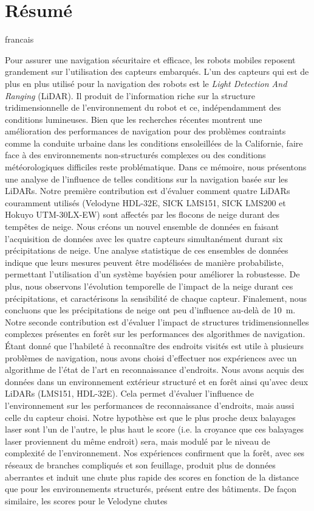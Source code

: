 \chapter*{Résumé}

\begin{otherlanguage*}{francais}

    Pour assurer une navigation sécuritaire et efficace, les robots mobiles reposent grandement sur l'utilisation des capteurs embarqués. L'un des capteurs qui est de plus en plus utilisé pour la navigation des robots est le \emph{Light Detection And Ranging} (LiDAR). Il produit de l'information riche sur la structure tridimensionnelle de l'environnement du robot et ce, indépendamment des conditions lumineuses. Bien que les recherches récentes montrent une amélioration des performances de navigation pour des problèmes contraints comme la conduite urbaine dans les conditions ensoleillées de la Californie, faire face à des environnements non-structurés complexes ou des conditions météorologiques difficiles reste problématique. Dans ce mémoire, nous présentons une analyse de l'influence de telles conditions sur la navigation basée sur les LiDARs. Notre première contribution est d'évaluer comment quatre LiDARs couramment utilisés (Velodyne HDL-32E, SICK LMS151, SICK LMS200 et Hokuyo UTM-30LX-EW) sont affectés par les flocons de neige durant des tempêtes de neige. Nous créons un nouvel ensemble de données en faisant l'acquisition de données avec les quatre capteurs simultanément durant six précipitations de neige. Une analyse statistique de ces ensembles de données indique que leurs mesures peuvent être modélisées de manière probabiliste, permettant l'utilisation d'un système bayésien pour améliorer la robustesse. De plus, nous observons l'évolution temporelle de l'impact de la neige durant ces précipitations, et caractérisons la sensibilité de chaque capteur. Finalement, nous concluons que les précipitations de neige ont peu d'influence au-delà de \SI{10}{\meter}. Notre seconde contribution est d'évaluer l'impact de structures tridimensionnelles complexes présentes en forêt sur les performances des algorithmes de navigation. Étant donné que l'habileté à reconnaître des endroits visités est utile à plusieurs problèmes de navigation, nous avons choisi d'effectuer nos expériences avec un algorithme de l'état de l'art en reconnaissance d'endroits. Nous avons acquis des données dans un environnement extérieur structuré et en forêt ainsi qu'avec deux LiDARs (LMS151, HDL-32E). Cela permet d'évaluer l'influence de l'environnement sur les performances de reconnaissance d'endroits, mais aussi celle du capteur choisi. Notre hypothèse est que le plus proche deux balayages laser sont l'un de l'autre, le plus haut le score (i.e. la croyance que ces balayages laser proviennent du même endroit) sera, mais modulé par le niveau de complexité de l'environnement. Nos expériences confirment que la forêt, avec ses réseaux de branches compliqués et son feuillage, produit plus de données aberrantes et induit une chute plus rapide des scores en fonction de la distance que pour les environnements structurés, présent entre des bâtiments. De façon similaire, les scores pour le Velodyne chutes 
\end{otherlanguage*}
